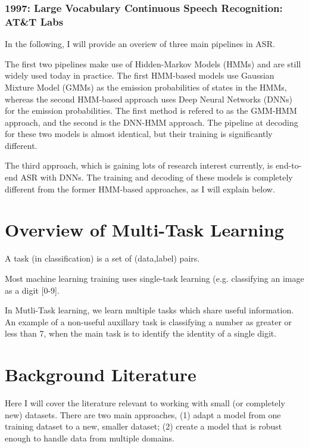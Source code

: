 \documentclass[10pt,a4paper]{article}
\begin{document}
\subsubsection{1997: Large Vocabulary Continuous Speech Recognition: AT\&T Labs}

In the following, I will provide an overiew of three main pipelines in ASR.

The first two pipelines make use of Hidden-Markov Models (HMMs) and are still widely used today in practice. The first HMM-based models use Gaussian Mixture Model (GMMs) as the emission probabilities of states in the HMMs, whereas the second HMM-based approach uses Deep Neural Networks (DNNs) for the emission probabilities. The first method is refered to as the GMM-HMM approach, and the second is the DNN-HMM approach. The pipeline at decoding for these two models is almost identical, but their training is significantly different.

The third approach, which is gaining lots of research interest currently, is end-to-end ASR with DNNs. The training and decoding of these models is completely different from the former HMM-based approaches, as I will explain below.


\newpage

\section{Overview of Multi-Task Learning}

A task (in classification) is a set of (data,label) pairs.

Most machine learning training uses single-task learning (e.g. classifying an image as a digit [0-9].

In Mutli-Task learning, we learn multiple tasks which share useful information. An example of a non-useful auxillary task is classifying a number as greater or less than 7, when the main task is to identify the identity of a single digit.



\newpage

\section{Background Literature}

Here I will cover the literature relevant to working with small (or completely new) datasets. There are two main approaches, (1) adapt a model from one training dataset to a new, smaller dataset; (2) create a model that is robust enough to handle data from multiple domains. 
\end{document}
